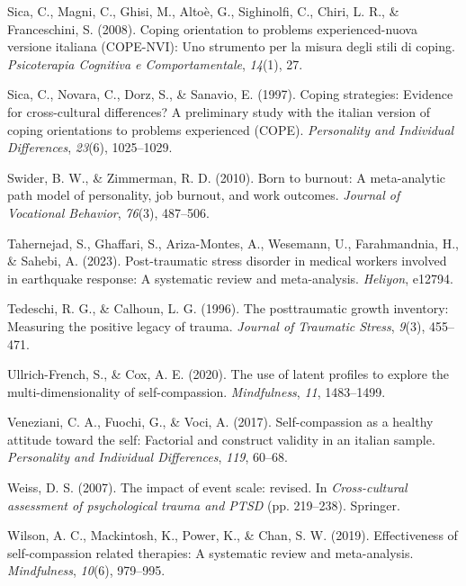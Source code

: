 \documentclass[
  man]{apa7}
\newlength{\cslhangindent}
\newlength{\cslentryspacingunit} %
\newenvironment{CSLReferences}[2] %
 {%
  \setlength{\parindent}{0pt}
  \ifodd #1
  \let\oldpar\par
  \def\par{\hangindent=\cslhangindent\oldpar}
  \fi
  \setlength{\parskip}{#2\cslentryspacingunit}
 }%
 {}
\begin{document}
\begin{CSLReferences}{1}{0}
\leavevmode{}%
Sica, C., Magni, C., Ghisi, M., Altoè, G., Sighinolfi, C., Chiri, L. R., \& Franceschini, S. (2008). Coping orientation to problems experienced-nuova versione italiana (COPE-NVI): Uno strumento per la misura degli stili di coping. \emph{Psicoterapia Cognitiva e Comportamentale}, \emph{14}(1), 27.

\leavevmode{}%
Sica, C., Novara, C., Dorz, S., \& Sanavio, E. (1997). Coping strategies: Evidence for cross-cultural differences? A preliminary study with the italian version of coping orientations to problems experienced (COPE). \emph{Personality and Individual Differences}, \emph{23}(6), 1025--1029.

\leavevmode{}%
Swider, B. W., \& Zimmerman, R. D. (2010). Born to burnout: A meta-analytic path model of personality, job burnout, and work outcomes. \emph{Journal of Vocational Behavior}, \emph{76}(3), 487--506.

\leavevmode{}%
Tahernejad, S., Ghaffari, S., Ariza-Montes, A., Wesemann, U., Farahmandnia, H., \& Sahebi, A. (2023). Post-traumatic stress disorder in medical workers involved in earthquake response: A systematic review and meta-analysis. \emph{Heliyon}, e12794.

\leavevmode{}%
Tedeschi, R. G., \& Calhoun, L. G. (1996). The posttraumatic growth inventory: Measuring the positive legacy of trauma. \emph{Journal of Traumatic Stress}, \emph{9}(3), 455--471.

\leavevmode{}%
Ullrich-French, S., \& Cox, A. E. (2020). The use of latent profiles to explore the multi-dimensionality of self-compassion. \emph{Mindfulness}, \emph{11}, 1483--1499.

\leavevmode{}%
Veneziani, C. A., Fuochi, G., \& Voci, A. (2017). Self-compassion as a healthy attitude toward the self: Factorial and construct validity in an italian sample. \emph{Personality and Individual Differences}, \emph{119}, 60--68.

\leavevmode{}%
Weiss, D. S. (2007). The impact of event scale: revised. In \emph{Cross-cultural assessment of psychological trauma and PTSD} (pp. 219--238). Springer.

\leavevmode{}%
Wilson, A. C., Mackintosh, K., Power, K., \& Chan, S. W. (2019). Effectiveness of self-compassion related therapies: A systematic review and meta-analysis. \emph{Mindfulness}, \emph{10}(6), 979--995.


\end{CSLReferences}
\end{document}
